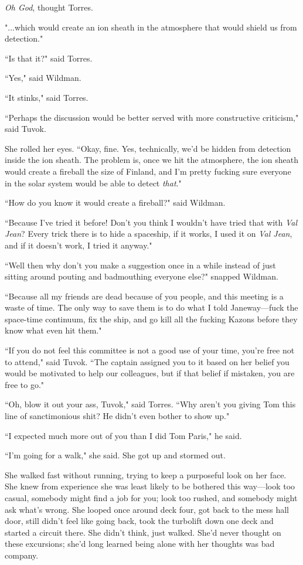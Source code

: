 \documentclass[twoside,letterpaper,12pt]{memoir}
\begin{document}
\textit{Oh God}, thought Torres. 

"...which would create an ion sheath in the atmosphere that would shield us from detection." 

``Is that it?" said Torres. 

``Yes," said Wildman. 

``It stinks," said Torres. 

``Perhaps the discussion would be better served with more constructive criticism," said Tuvok. 

She rolled her eyes. ``Okay, fine. Yes, technically, we'd be hidden from detection inside the ion sheath. The problem is, once we hit the atmosphere, the ion sheath would create a fireball the size of Finland, and I'm pretty fucking sure everyone in the solar system would be able to detect \textit{that}." 

``How do you know it would create a fireball?" said Wildman. 

``Because I've tried it before! Don't you think I wouldn't have tried that with \textit{Val Jean}? Every trick there is to hide a spaceship, if it works, I used it on \textit{Val Jean}, and if it doesn’t work, I tried it anyway." 

``Well then why don't you make a suggestion once in a while instead of just sitting around pouting and badmouthing everyone else?" snapped Wildman. 

``Because all my friends are dead because of you people, and this meeting is a waste of time. The only way to save them is to do what I told Janeway---fuck the space-time continuum, fix the ship, and go kill all the fucking Kazons before they know what even hit them." 

``If you do not feel this committee is not a good use of your time, you're free not to attend," said Tuvok. ``The captain assigned you to it based on her belief you would be motivated to help our colleagues, but if that belief if mistaken, you are free to go." 

``Oh, blow it out your ass, Tuvok," said Torres. ``Why aren't you giving Tom this line of sanctimonious shit? He didn't even bother to show up." 

``I expected much more out of you than I did Tom Paris," he said. 

``I'm going for a walk," she said. She got up and stormed out. 

She walked fast without running, trying to keep a purposeful look on her face. She knew from experience she was least likely to be bothered this way---look too casual, somebody might find a job for you; look too rushed, and somebody might ask what's wrong. She looped once around deck four, got back to the mess hall door, still didn't feel like going back, took the turbolift down one deck and started a circuit there. She didn't think, just walked. She'd never thought on these excursions; she'd long learned being alone with her thoughts was bad company. 
\end{document}

